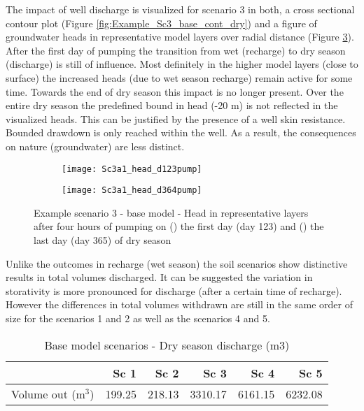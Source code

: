 The impact of well discharge is visualized for scenario 3 in both, a cross sectional contour plot (Figure \ref{fig:Example_Sc3_base_cont_dry}) and a figure of groundwater heads in representative model layers over radial distance (Figure \ref{fig:Example_Sc3_base_head_dry}). After the first day of pumping the transition from wet (recharge) to dry season (discharge) is still of influence. Most definitely in the higher model layers (close to surface) the increased heads (due to wet season recharge) remain active for some time. Towards the end of dry season this impact is no longer present. Over the entire dry season the predefined bound in head (-20 m) is not reflected in the visualized heads. This can be justified by the presence of a well skin resistance. Bounded drawdown is only reached within the well. As a result, the consequences on nature (groundwater) are less distinct.   

\begin{figure}[h!]
	\centering
	\begin{subfigure}[b]{0.5\linewidth}
		\centering\texttt{[image: Sc3a1\_head\_d123pump]}
		\captionsetup{justification=centering}		
		\caption{\label{fig:Sc3a1_head_d123pump}}
		\end{subfigure}\hfill
	\begin{subfigure}[b]{0.5\linewidth}
        \centering\texttt{[image: Sc3a1\_head\_d364pump]}
		\captionsetup{justification=centering}		
		\caption{\label{fig:Sc3a1_head_d364pump}}
		\end{subfigure}
		\captionsetup{justification=centering}	
	\caption{Example scenario 3 - base model - Head in representative layers after four hours of pumping on () the first day (day 123) and () the last day (day 365) of dry season} 
	\label{fig:Example_Sc3_base_head_dry}
\end{figure} 

Unlike the outcomes in recharge (wet season) the soil scenarios show distinctive results in total volumes discharged. It can be suggested the variation in storativity is more pronounced for discharge (after a certain time of recharge). However the differences in total volumes withdrawn are still in the same order of size for the scenarios 1 and 2 as well as the scenarios 4 and 5. 

\begin{table}[h!]
\small
\centering
\caption{Base model scenarios - Dry season discharge (m3)}
\label{tab:Base_discharge}
\begin{tabular}{l|r|r|r|r|r}
\hline 
\textbf{}               & \textbf{Sc 1} & \textbf{Sc 2} & \textbf{Sc 3} & \textbf{Sc 4}  & \textbf{Sc 5} \\ \hline \hline
Volume out (m$^3$)       & 199.25        & 218.13        & 3310.17       & 6161.15 	      & 6232.08          \\ \hline    
\end{tabular}
\end{table}

